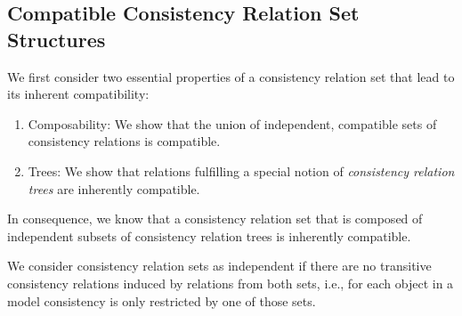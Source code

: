 \subsection{Compatible Consistency Relation Set Structures}

We first consider two essential properties of a consistency relation set that lead to its inherent compatibility:
\begin{enumerate}
    \item Composability: We show that the union of independent, compatible sets of consistency relations is compatible.
    \item Trees: We show that relations fulfilling a special notion of \emph{consistency relation trees} are inherently compatible.
\end{enumerate}
In consequence, we know that a consistency relation set that is composed of independent subsets of consistency relation trees is inherently compatible.

We consider consistency relation sets as independent if there are no transitive consistency relations induced by relations from both sets, i.e., for each object in a model consistency is only restricted by one of those sets.

